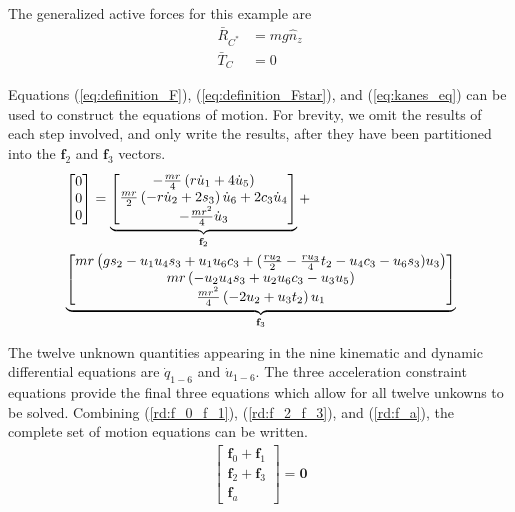 \documentclass[smallcondensed,final]{svjour3}                     %
\begin{document}
The generalized active forces for this example are
\begin{align}
    \bar{R}_{C^*} &= m g \hat{n}_z \\
    \bar{T}_C &= 0
\end{align}

Equations (\ref{eq:definition_F}), (\ref{eq:definition_Fstar}), and
(\ref{eq:kanes_eq}) can be used to construct the equations of motion.
For brevity, we omit the results of each step involved, and only write the
results, after they have been partitioned into the $\mathbf{f}_2$ and
$\mathbf{f}_3$ vectors.
\begin{align}
    \label{rd:f_2_f_3}
    & \left[\begin{matrix} 0\\ 0\\ 0\end{matrix}\right] =
    \underbrace{\left[\begin{matrix}- \frac{m r}{4} \left(r \dot{u}_{1} + 4
                \dot{u}_{5}\right)\\\frac{m r}{2} \left(- r \dot{u}_{2} + 2
                s_3\right) \dot{u}_{6} + 2 c_3
                \dot{u}_{4}\\- \frac{m r^{2}}{4}
                \dot{u}_{3}\end{matrix}\right]}_{\mathbf{f}_2} + \notag\\
    &\underbrace{\left[\begin{matrix}
                m r \left( g s_2 - u_1 u_4 s_3 + u_1 u_6 c_3
                    + (\frac{r u_2}{2} - \frac{r u_3}{4} t_2 - u_4
                c_3 - u_6 s_3) u_3 \right)
                \\m r \left(- u_{2} u_{4}
                s_3 + u_{2} u_{6}
                c_3 - u_{3} u_{5}\right)\\\frac{m r^{2}}{4}
                \left(- 2 u_{2} + u_{3} t_2\right)
                u_{1}\end{matrix}\right]}_{\mathbf{f}_3} 
\end{align}

The twelve unknown quantities appearing in the nine kinematic and dynamic
differential equations are $\dot{q}_{1-6}$ and $\dot{u}_{1-6}$. The three
acceleration constraint equations provide the final three equations which allow
for all twelve unkowns to be solved. Combining (\ref{rd:f_0_f_1}),
(\ref{rd:f_2_f_3}), and (\ref{rd:f_a}), the complete set of motion equations
can be written.
\begin{align}
\label{rd:ode}
\begin{bmatrix} \mathbf{f}_0 + \mathbf{f}_1\\
                \mathbf{f}_2 + \mathbf{f}_3\\
                \mathbf{f}_a \end{bmatrix} = \mathbf{0}
\end{align}
\end{document}
